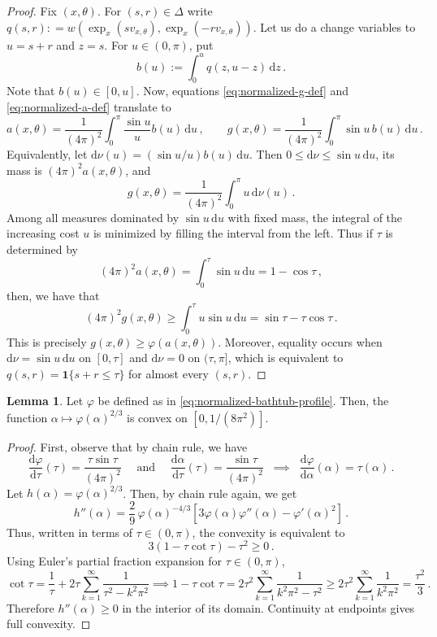 \documentclass[reqno, 11pt]{amsart}
\theoremstyle{definition}
\newtheorem{lemma}{Lemma}
\newcommand{\sqb}[1]{\left[ #1 \right]}
\newcommand{\dd}{\mathrm{d}}
\newcommand{\II}[1]{\mathbf{1}{#1}}
\begin{document}
\begin{proof}
Fix \((x,\theta)\). For $(s,r) \in \Delta$  write $q(s,r): =w\left(\exp_x(sv_{x,\theta}),\exp_x(-rv_{x,\theta})\right)$. Let us do a change variables to \(u=s+r\) and \(z=s\).  For \(u \in (0, \pi)\), put
\[
        b(u):=\int_0^u q(z,u-z)\,\dd z\,.
\]
Note that $b(u) \in [0,u]$. Now, equations \eqref{eq:normalized-g-def} and \eqref{eq:normalized-a-def} translate to 
\[
       a(x,\theta)= \frac{1}{ (4\pi)^2}\int_0^\pi \frac{\sin u}{u}b(u)\,\dd u\,,
        \qquad
       g(x,\theta)=\frac{1}{ (4\pi)^2}\int_0^\pi \sin u\,b(u)\,\dd u\,.
\]
Equivalently, let \(\dd\nu(u)=(\sin u/u)b(u)\,\dd u\).  Then \(0\le\dd\nu\le \sin u\,\dd u\), its mass is \((4\pi)^2a(x,\theta)\), and
\[
        g(x,\theta)=\frac{1}{(4\pi)^2}\int_0^\pi u\,\dd\nu(u)\,.
\]
Among all measures dominated by \(\sin u\,\dd u\) with fixed mass, the integral of the increasing cost \(u\) is minimized by filling the interval from the left.  Thus if \(\tau\) is determined by
\[
        (4\pi)^2a(x,\theta)=\int_0^\tau \sin u\,\dd u=1-\cos \tau \,,
\]
then, we have that 
\[
        (4\pi)^2g(x,\theta)
        \ge
        \int_0^\tau  u\sin u\,\dd u
        =\sin \tau -\tau \cos \tau \,.
\]
This is precisely \(g(x,\theta)\ge\varphi(a(x,\theta))\). Moreover, equality occurs when \(\dd\nu=\sin u\,\dd u\) on \([0,\tau ]\) and \(\dd\nu=0\) on \((\tau ,\pi]\), which is equivalent to \(q(s,r)=\II{\{s+r\le \tau \}}\) for almost every \((s,r)\).
\end{proof}

\begin{lemma}\label{lem:normalized-convexity-main}
Let $\varphi$ be defined as in \eqref{eq:normalized-bathtub-profile}.
 Then, the function \(\alpha \mapsto \varphi(\alpha)^{2/3}\) is convex on \([0,1/(8\pi^2)]\).
\end{lemma}

\begin{proof}
First, observe that by chain rule, we have 
\begin{equation*}
    \frac{\dd \varphi}{\dd \tau}(\tau) = \frac{\tau \sin \tau}{(4\pi)^2} \quad \text{ and } \quad \frac{\dd \alpha}{\dd \tau}(\tau) = \frac{\sin \tau}{(4\pi)^2} \; \;\implies \;\; \frac{\dd \varphi }{\dd \alpha}(\alpha) = \tau(\alpha)\,.
\end{equation*}
Let $h(\alpha) = \varphi(\alpha)^{2/3}$. Then, by chain rule again, we get
\[
       h''(\alpha)
        = \frac{2}{9}\,\varphi(\alpha)^{-4/3}\sqb{3\varphi(\alpha)\varphi ''(\alpha)  - \varphi'(\alpha)^2}\,.
\]
Thus, written in terms of $\tau \in (0,\pi)$, the convexity is equivalent to
\[
        3 (1 - \tau \cot \tau ) - \tau^2 \geq 0\,.
\]
Using Euler's partial fraction expansion for $\tau \in (0, \pi)$,
\[
        \cot \tau=\frac1\tau+2\tau\sum_{k=1}^{\infty}\frac1{\tau^2-k^2\pi^2} \implies 1-\tau\cot \tau
        =2\tau^2\sum_{k=1}^{\infty}\frac1{k^2\pi^2-\tau^2}
        \ge
        2\tau^2\sum_{k=1}^{\infty}\frac1{k^2\pi^2}
        =\frac{\tau^2}{3}\,.
\]
Therefore \(h''(\alpha)\ge0\) in the interior of its domain.  Continuity at endpoints gives full convexity.
\end{proof}
\end{document}
